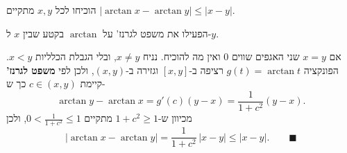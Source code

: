 
\begin{question}
הוכיחו לכל $x,y$ מתקיים $|\arctan x-\arctan y|\le|x-y|$.
\end{question}

\begin{hint}
הפעילו את משפט לגרנז' על $\arctan$ בקטע שבין $x$ ל-$y$.
\end{hint}

\begin{solution}
אם $x=y$ שני האגפים שווים $0$ ואין מה להוכיח. נניח $x\neq y$, ובלי הגבלת הכלליות $x<y$. הפונקציה $g(t)=\arctan t$ רציפה ב-$[x,y]$ וגזירה ב-$(x,y)$, ולכן לפי \textbf{משפט לגרנז'} קיימת $c\in(x,y)$ כך ש-
\[ \arctan y-\arctan x=g'(c)(y-x)=\frac{1}{1+c^2}(y-x). \]
מכיוון ש-$1+c^2\ge 1$ מתקיים $0<\frac{1}{1+c^2}\le 1$, ולכן
\[ |\arctan x-\arctan y|=\frac{1}{1+c^2}\,|x-y|\le|x-y|. \qquad\blacksquare \]
\end{solution}
